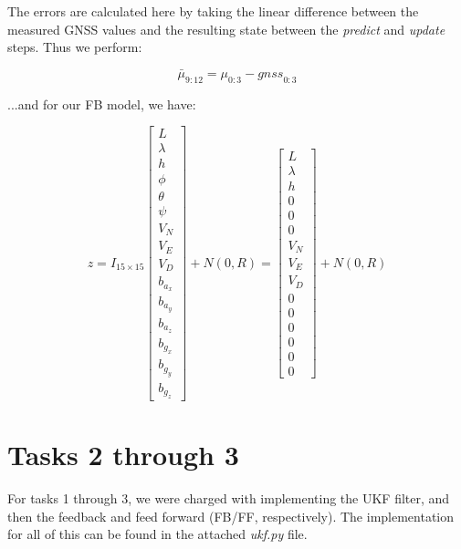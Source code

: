 \documentclass{article}
\begin{document}
The errors are calculated here by taking the linear difference between the measured GNSS values and the resulting state between the \textit{predict} and \textit{update} steps. Thus we perform:

\begin{equation}
    \bar{\mu}_{9:12} = \mu_{0:3} - {gnss}_{0:3}
\end{equation}

...and for our FB model, we have:

\begin{equation}
    z = I_{15\times 15} \begin{bmatrix}
        L \\ \lambda \\ h \\ \phi \\ \theta \\ \psi \\ V_N \\ V_E \\ V_D \\ b_{a_x} \\ b_{a_y} \\ b_{a_z} \\ b_{g_x} \\ b_{g_y} \\ b_{g_z}
    \end{bmatrix} + N(0, R) = \begin{bmatrix}
        L \\ \lambda \\ h \\ 0 \\ 0 \\ 0 \\ V_N \\ V_E \\ V_D \\ 0 \\ 0 \\ 0 \\ 0 \\ 0 \\ 0
    \end{bmatrix} + N(0, R)
\end{equation}

\section*{Tasks 2 through 3}

For tasks 1 through 3, we were charged with implementing the UKF filter, and then the feedback and feed forward (FB/FF, respectively). The implementation for all of this can be found in the attached \textit{ukf.py} file.
\end{document}

